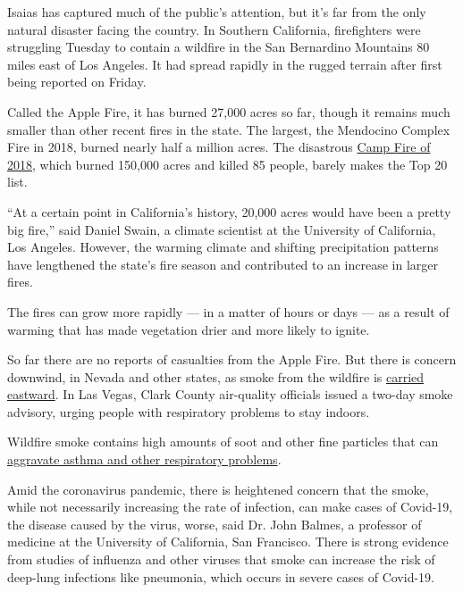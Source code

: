 Isaias has captured much of the public's attention, but it's far from
the only natural disaster facing the country. In Southern California,
firefighters were struggling Tuesday to contain a wildfire in the San
Bernardino Mountains 80 miles east of Los Angeles. It had spread rapidly
in the rugged terrain after first being reported on Friday.

Called the Apple Fire, it has burned 27,000 acres so far, though it
remains much smaller than other recent fires in the state. The largest,
the Mendocino Complex Fire in 2018, burned nearly half a million acres.
The disastrous
\href{https://www.nytimes3xbfgragh.onion/interactive/2019/07/31/magazine/paradise-camp-fire-california.html}{Camp
Fire of 2018}, which burned 150,000 acres and killed 85 people, barely
makes the Top 20 list.

``At a certain point in California's history, 20,000 acres would have
been a pretty big fire,'' said Daniel Swain, a climate scientist at the
University of California, Los Angeles. However, the warming climate and
shifting precipitation patterns have lengthened the state's fire season
and contributed to an increase in larger fires.

The fires can grow more rapidly --- in a matter of hours or days --- as
a result of warming that has made vegetation drier and more likely to
ignite.

So far there are no reports of casualties from the Apple Fire. But there
is concern downwind, in Nevada and other states, as smoke from the
wildfire is
\href{https://rapidrefresh.noaa.gov/hrrr/HRRRsmoke/jsloopLocalDiskDateDomainZipTZA.cgi?dsKeys=hrrr_smoke_jet:\&runTime=2020080314\&plotName=trc1_t4sfc\&fcstInc=60\&numFcsts=49\&model=hrrr\&ptitle=HRRR-Smoke\%20Model\%20Fields\%20-\%20Experimental\&maxFcstLen=48\&fcstStrLen=-1\&resizePlot=1\&domain=t4}{carried
eastward}. In Las Vegas, Clark County air-quality officials issued a
two-day smoke advisory, urging people with respiratory problems to stay
indoors.

Wildfire smoke contains high amounts of soot and other fine particles
that can
\href{https://www.nytimes3xbfgragh.onion/2019/10/24/climate/california-wildfires-climate-change.html}{aggravate
asthma and other respiratory problems}.

Amid the coronavirus pandemic, there is heightened concern that the
smoke, while not necessarily increasing the rate of infection, can make
cases of Covid-19, the disease caused by the virus, worse, said Dr. John
Balmes, a professor of medicine at the University of California, San
Francisco. There is strong evidence from studies of influenza and other
viruses that smoke can increase the risk of deep-lung infections like
pneumonia, which occurs in severe cases of Covid-19.

